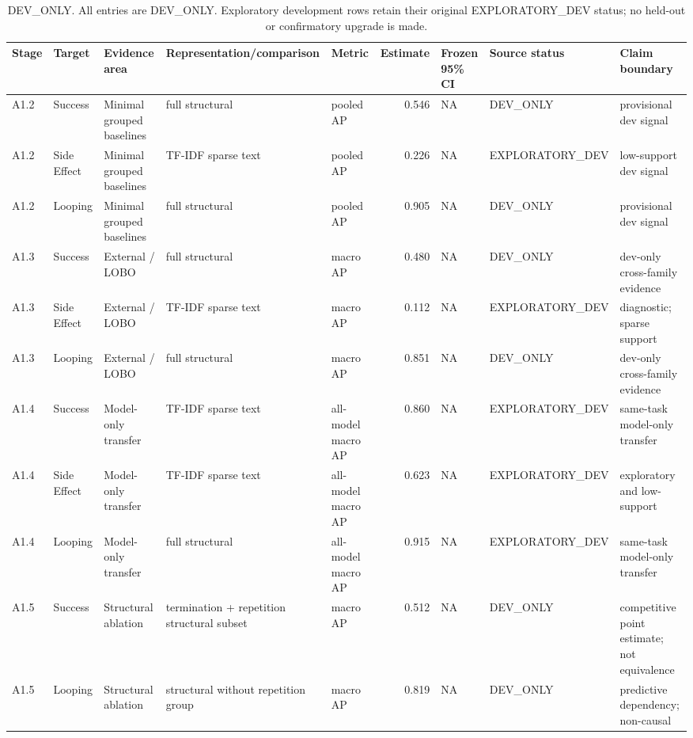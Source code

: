 \begin{table}[t]
\centering
\scriptsize
\caption{DEV\_ONLY. All entries are DEV\_ONLY. Exploratory development rows retain their original EXPLORATORY\_DEV status; no held-out or confirmatory upgrade is made.}
\label{tab:dev-representation-robustness}
\begin{tabular}{llp{}p{}p{}rp{}p{}p{}}
\hline
Stage & Target & Evidence area & Representation/comparison & Metric & Estimate & Frozen 95\% CI & Source status & Claim boundary \\
\hline
A1.2 & Success & Minimal grouped baselines & full structural & pooled AP & 0.546 & NA & DEV\_ONLY & provisional dev signal \\
A1.2 & Side Effect & Minimal grouped baselines & TF-IDF sparse text & pooled AP & 0.226 & NA & EXPLORATORY\_DEV & low-support dev signal \\
A1.2 & Looping & Minimal grouped baselines & full structural & pooled AP & 0.905 & NA & DEV\_ONLY & provisional dev signal \\
A1.3 & Success & External / LOBO & full structural & macro AP & 0.480 & NA & DEV\_ONLY & dev-only cross-family evidence \\
A1.3 & Side Effect & External / LOBO & TF-IDF sparse text & macro AP & 0.112 & NA & EXPLORATORY\_DEV & diagnostic; sparse support \\
A1.3 & Looping & External / LOBO & full structural & macro AP & 0.851 & NA & DEV\_ONLY & dev-only cross-family evidence \\
A1.4 & Success & Model-only transfer & TF-IDF sparse text & all-model macro AP & 0.860 & NA & EXPLORATORY\_DEV & same-task model-only transfer \\
A1.4 & Side Effect & Model-only transfer & TF-IDF sparse text & all-model macro AP & 0.623 & NA & EXPLORATORY\_DEV & exploratory and low-support \\
A1.4 & Looping & Model-only transfer & full structural & all-model macro AP & 0.915 & NA & EXPLORATORY\_DEV & same-task model-only transfer \\
A1.5 & Success & Structural ablation & termination + repetition structural subset & macro AP & 0.512 & NA & DEV\_ONLY & competitive point estimate; not equivalence \\
A1.5 & Looping & Structural ablation & structural without repetition group & macro AP & 0.819 & NA & DEV\_ONLY & predictive dependency; non-causal \\

\end{tabular}
\end{table}
